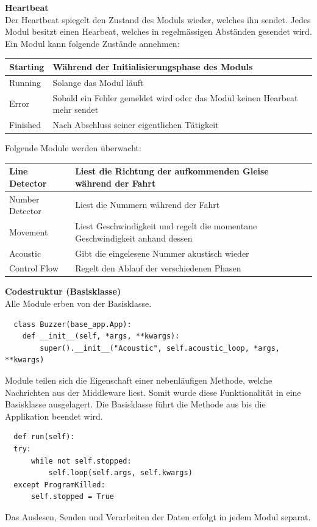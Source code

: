 \documentclass[../../main.tex]{subfiles}
\begin{document}
\textbf{Heartbeat} \\
Der Heartbeat spiegelt den Zustand des Moduls wieder, welches ihn sendet.
Jedes Modul besitzt einen Hearbeat, welches in regelmässigen Abständen gesendet wird. Ein Modul kann folgende Zustände annehmen:
\begin{table}[H]
    \begin{tabular}{ll}
    \hline
    Starting & Während der Initialisierungsphase des Moduls \\ \hline
    Running & Solange das Modul läuft\\ \hline
    Error & Sobald ein Fehler gemeldet wird oder das Modul keinen Hearbeat mehr sendet\\ \hline
    Finished & Nach Abschluss seiner eigentlichen Tätigkeit\\ \hline
    \end{tabular}
\end{table} 
Folgende Module werden überwacht:
\begin{table}[H]
    \begin{tabular}{ll}
    \hline
    Line Detector & Liest die Richtung der aufkommenden Gleise während der Fahrt \\ \hline
    Number Detector & Liest die Nummern während der Fahrt\\ \hline
    Movement & Liest Geschwindigkeit und regelt die momentane Geschwindigkeit anhand dessen\\ \hline
    Acoustic & Gibt die eingelesene Nummer akustisch wieder\\ \hline
    Control Flow & Regelt den Ablauf der verschiedenen Phasen \\ \hline
    \end{tabular}
\end{table}
\textbf{Codestruktur (Basisklasse)} \\
Alle Module erben von der Basisklasse.\\
\begin{lstlisting}
  class Buzzer(base_app.App):
    def __init__(self, *args, **kwargs):
        super().__init__("Acoustic", self.acoustic_loop, *args, **kwargs)
\end{lstlisting}
Module teilen sich die Eigenschaft einer nebenläufigen Methode, welche Nachrichten aus der Middleware liest. Somit wurde diese Funktionalität in eine Basisklasse ausgelagert. Die Basisklasse führt die Methode aus bis die Applikation beendet wird.\\
\begin{lstlisting}
  def run(self):
  try:
      while not self.stopped:
          self.loop(self.args, self.kwargs)
  except ProgramKilled:
      self.stopped = True
\end{lstlisting}
Das Auslesen, Senden und Verarbeiten der Daten erfolgt in jedem Modul separat.
\end{document}
